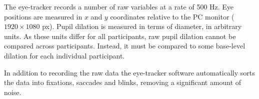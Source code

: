 The eye-tracker records a number of raw variables at a rate of 500 Hz.
Eye positions are measured in \(x\) and \(y\) coordinates relative to the PC monitor (\(1920 \times 1080\) px).
Pupil dilation is measured in terms of diameter, in arbitrary units. 
As these units differ for all participants, raw pupil dilation cannot be compared across participants. 
Instead, it must be compared to some base-level dilation for each individual participant. 

In addition to recording the raw data the eye-tracker software automatically sorts the data into fixations, saccades and blinks, removing a significant amount of noise. 